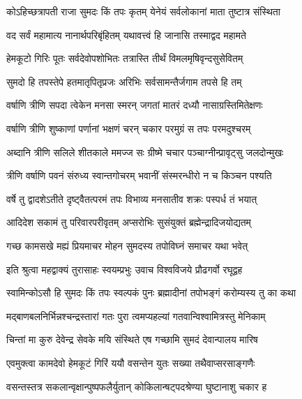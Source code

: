 
\twolineshloka
{कोऽहिच्छत्रापती राजा सुमदः किं तपः कृतम्}
{येनेयं सर्वलोकानां माता तुष्टात्र संस्थिता}%

\twolineshloka
{वद सर्वं महामात्य नानार्थपरिबृंहितम्}
{यथावत्त्वं हि जानासि तस्माद्वद महामते}%


\twolineshloka
{हेमकूटो गिरिः पूतः सर्वदेवोपशोभितः}
{तत्रास्ति तीर्थं विमलमृषिवृन्दसुसेवितम्}%

\twolineshloka
{सुमदो हि तपस्तेपे हतमातृपितृप्रजः}
{अरिभिः सर्वसामन्तैर्जगाम तपसे हि तम्}%

\twolineshloka
{वर्षाणि त्रीणि सपदा त्वेकेन मनसा स्मरन्}
{जगतां मातरं दध्यौ नासाग्रस्तिमितेक्षणः}%

\twolineshloka
{वर्षाणि त्रीणि शुष्काणां पर्णानां भक्षणं चरन्}
{चकार परमुग्रं स तपः परमदुश्चरम्}%

\twolineshloka
{अब्दानि त्रीणि सलिले शीतकाले ममज्ज सः}
{ग्रीष्मे चचार पञ्चाग्नीन्प्रावृट्सु जलदोन्मुखः}%

\twolineshloka
{त्रीणि वर्षाणि पवनं संरुध्य स्वान्तगोचरम्}
{भवानीं संस्मरन्धीरो न च किञ्चन पश्यति}%

\twolineshloka
{वर्षे तु द्वादशेऽतीते दृष्ट्वैतत्परमं तपः}
{विभाव्य मनसातीव शक्रः पस्पर्ध तं भयात्}%

\twolineshloka
{आदिदेश सकामं तु परिवारपरीवृतम्}
{अप्सरोभिः सुसंयुक्तं ब्रह्मेन्द्रादिजयोद्यतम्}%

\twolineshloka
{गच्छ कामसखे मह्यं प्रियमाचर मोहन}
{सुमदस्य तपोविघ्नं समाचर यथा भवेत्}%

\twolineshloka
{इति श्रुत्वा महद्वाक्यं तुरासाहः स्वयम्प्रभुः}
{उवाच विश्वविजये प्रौढगर्वो रघूद्वह}%


\twolineshloka
{स्वामिन्कोऽसौ हि सुमदः किं तपः स्वल्पकं पुनः}
{ब्रह्मादीनां तपोभङ्गं करोम्यस्य तु का कथा}%

\twolineshloka
{मद्बाणबलनिर्भिन्नश्चन्द्रस्तारां गतः पुरा}
{त्वमप्यहल्यां गतवान्विश्वामित्रस्तु मेनिकाम्}%

\twolineshloka
{चिन्तां मा कुरु देवेन्द्र सेवके मयि संस्थिते}
{एष गच्छामि सुमदं देवान्पालय मारिष}%

\twolineshloka
{एवमुक्त्वा कामदेवो हेमकूटं गिरिं ययौ}
{वसन्तेन युतः सख्या तथैवाप्सरसाङ्गणैः}%

\twolineshloka
{वसन्तस्तत्र सकलान्वृक्षान्पुष्पफलैर्युतान्}
{कोकिलान्षट्पदश्रेण्या घुष्टानाशु चकार ह}%

